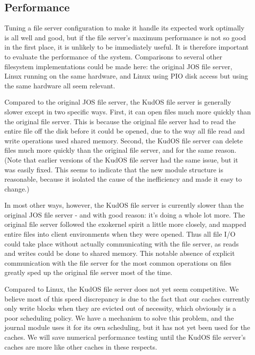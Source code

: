 \subsection{Performance}
\label{sec:eval:performance}

Tuning a file server configuration to make it handle its expected work optimally
is all well and good, but if the file server's maximum performance is not so
good in the first place, it is unlikely to be immediately useful. It is
therefore important to evaluate the performance of the system. Comparisons to
several other filesystem implementations could be made here: the original JOS
file server, Linux running on the same hardware, and Linux using PIO disk access
but using the same hardware all seem relevant.

Compared to the original JOS file server, the KudOS file server is generally
slower except in two specific ways. First, it can open files much more quickly
than the original file server. This is because the original file server had to
read the entire file off the disk before it could be opened, due to the way all
file read and write operations used shared memory. Second, the KudOS file server
can delete files much more quickly than the original file server, and for the
same reason. (Note that earlier versions of the KudOS file server had the same
issue, but it was easily fixed. This seems to indicate that the new module
structure is reasonable, because it isolated the cause of the inefficiency and
made it easy to change.)

In most other ways, however, the KudOS file server is currently slower than the
original JOS file server - and with good reason: it's doing a whole lot more.
The original file server followed the exokernel spirit a little more closely,
and mapped entire files into client environments when they were opened. Thus all
file I/O could take place without actually communicating with the file server,
as reads and writes could be done to shared memory. This notable absence of
explicit communication with the file server for the most common operations on
files greatly sped up the original file server most of the time.

Compared to Linux, the KudOS file server does not yet seem competitive. We
believe most of this speed discrepancy is due to the fact that our caches
currently only write blocks when they are evicted out of necessity, which
obviously is a poor scheduling policy. We have a mechanism to solve this
problem, and the journal module uses it for its own scheduling, but it has not
yet been used for the caches. We will save numerical performance testing until
the KudOS file server's caches are more like other caches in these respects.
